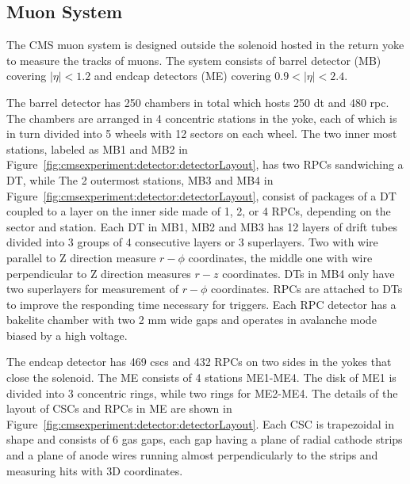 \subsection{Muon System}
The CMS muon system \cite{cms:muonChamberTdr:CMS:1997iti} is designed outside the solenoid hosted in the return yoke to measure the tracks of muons. The system consists of barrel detector (MB) covering $|\eta|<1.2$ and endcap detectors (ME) covering $0.9 < |\eta| < 2.4$. 

The barrel detector has 250 chambers in total which hosts 250 \acrfull{dt} and 480 \acrfull{rpc}. The chambers are  arranged in 4 concentric stations in the yoke, each of which is in turn divided into 5 wheels with 12 sectors on each wheel. The two inner most stations, labeled as MB1 and MB2 in Figure~\ref{fig:cmsexperiment:detector:detectorLayout}, has two RPCs sandwiching a DT, while The 2 outermost stations, MB3 and MB4 in Figure~\ref{fig:cmsexperiment:detector:detectorLayout}, consist of packages of a DT coupled to a layer on the inner side made of 1, 2, or 4 RPCs, depending on the sector and station.
Each DT in MB1, MB2 and MB3 has 12 layers of drift tubes divided into 3 groups of 4 consecutive layers or 3 superlayers. Two with wire parallel to Z direction measure $r-\phi$ coordinates, the middle one with wire perpendicular to Z direction measures $r-z$ coordinates. DTs in MB4 only have two superlayers for measurement of $r-\phi$ coordinates. RPCs are attached to DTs to improve the responding time necessary for triggers. Each RPC detector has a bakelite chamber with two 2 mm wide gaps and operates in avalanche mode biased by a high voltage. 

The endcap detector has 469 \acrfull{csc}s and 432 RPCs on two sides in the yokes that close the solenoid. The ME consists of 4 stations ME1-ME4. The disk of ME1 is divided into 3 concentric rings, while two rings for ME2-ME4. The details of the layout of CSCs and RPCs in ME are shown in Figure~\ref{fig:cmsexperiment:detector:detectorLayout}. Each CSC is trapezoidal in shape and consists of 6 gas gaps, each gap having a plane of radial cathode strips and a plane of anode wires running almost perpendicularly to the strips and measuring hits with 3D coordinates.

